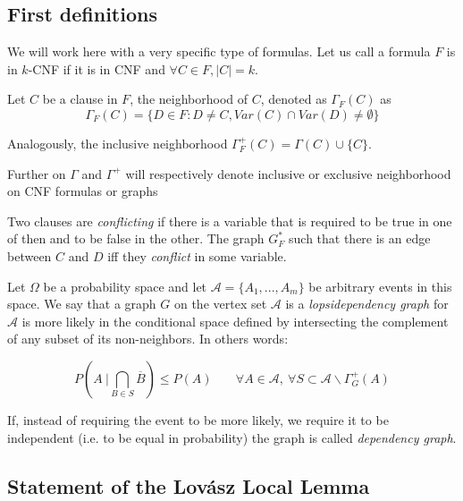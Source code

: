 \subsection{First definitions}

We will work here with a very specific type of formulas. Let us call a formula $F$ is in $k$-CNF
if it is in CNF and $\forall C \in F, |C| = k$.
\begin{definition}
	Let $C$ be a clause in $F$, the neighborhood of $C$, denoted as $\Gamma_F(C)$ as 
	$$ \Gamma_F(C) = \{ D \in F : D\ne C, Var(C) \cap Var(D) \ne \emptyset\}$$
	
	Analogously, the inclusive neighborhood $\Gamma_F^+(C) = \Gamma(C) \cup \{C\}$. 
\end{definition}


Further on $\Gamma$ and $\Gamma^+$ will respectively denote inclusive or exclusive neighborhood on CNF formulas or graphs


\begin{definition}
	
	Two clauses are \emph{conflicting} if there is a variable that is required to be true in one of then and to be false in the other. The graph $G_F^*$ such that there is an edge between $C$ and $D$ iff they \emph{conflict} in some variable.
	
\end{definition}
	



\begin{definition} Let $\Omega$ be a probability space and let 
$\mathcal{A} = \{A_1,...,A_m\}$ be arbitrary events in this space. We say that a graph $G$ on the vertex set $\mathcal{A}$ is a \emph{lopsidependency graph }for $\mathcal{A}$ is more likely in the conditional space defined by intersecting the complement of any subset of its non-neighbors. In others words:

\[
 P\left(  A\ \Big | \bigcap_{B\in S} \overline{B} \right ) \le P(A) \ \ \ \ \quad \forall A \in \mathcal{A},\ \forall S \subset \mathcal{A} \backslash\Gamma_G^+(A) 
\]


If, instead of requiring the event to be more likely, we require it to be independent (i.e. to be equal in probability) the graph is called \emph{dependency graph}.

\end{definition}

\subsection{Statement of the Lovász Local Lemma}

